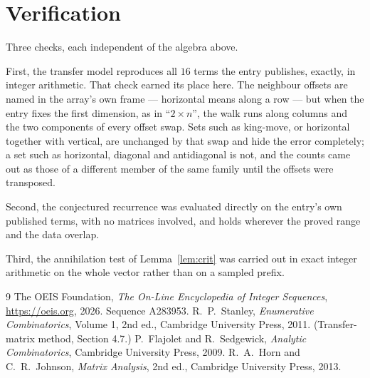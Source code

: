 \documentclass[11pt,a4paper]{article}
\theoremstyle{plain}
\theoremstyle{definition}
\begin{document}
\section{Verification}

Three checks, each independent of the algebra above.

First, the transfer model reproduces all $16$ terms the entry publishes, exactly, in
integer arithmetic. That check earned its place here. The neighbour offsets are named in the
array's own frame --- horizontal means along a row --- but when the entry fixes the first
dimension, as in ``$2\times n$'', the walk runs along columns and the two components of every
offset swap. Sets such as king-move, or horizontal together with vertical, are unchanged by
that swap and hide the error completely; a set such as horizontal, diagonal and antidiagonal
is not, and the counts came out as those of a different member of the same family until the
offsets were transposed.

Second, the conjectured recurrence was evaluated directly on the entry's own published terms,
with no matrices involved, and holds wherever the proved range and the data overlap.

Third, the annihilation test of Lemma~\ref{lem:crit} was carried out in exact integer
arithmetic on the whole vector rather than on a sampled prefix.

\begin{thebibliography}{9}
 The OEIS Foundation, \emph{The On-Line Encyclopedia of Integer
Sequences}, \url{https://oeis.org}, 2026. Sequence A283953.
 R.~P.~Stanley, \emph{Enumerative Combinatorics}, Volume 1, 2nd ed.,
Cambridge University Press, 2011. (Transfer-matrix method, Section 4.7.)
 P.~Flajolet and R.~Sedgewick, \emph{Analytic Combinatorics}, Cambridge
University Press, 2009.
 R.~A.~Horn and C.~R.~Johnson, \emph{Matrix Analysis}, 2nd ed., Cambridge
University Press, 2013.
\end{thebibliography}
\end{document}
